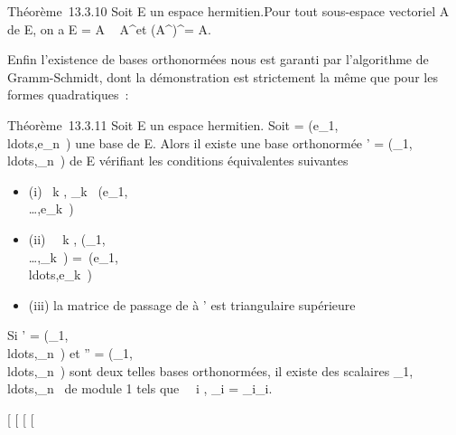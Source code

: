 \documentclass[]{article}
\begin{document}
Théorème~13.3.10 Soit E un espace hermitien.Pour tout sous-espace
vectoriel A de E, on a E = A \oplus~ A^\bot et
(A^\bot)^\bot = A.

Enfin l'existence de bases orthonormées nous est garanti par
l'algorithme de Gramm-Schmidt, dont la démonstration est strictement la
même que pour les formes quadratiques~:

Théorème~13.3.11 Soit E un espace hermitien. Soit  =
(e_1,\\ldots,e_n~)
une base de E. Alors il existe une base orthonormée ' =
(\epsilon_1,\\ldots,\epsilon_n~)
de E vérifiant les conditions équivalentes suivantes

\begin{itemize}
\itemsep1pt\parskip0pt
\item
  (i) \forall~k \in [1,n], \epsilon_k~
  \in\mathrmVect(e_1,\\\ldots,e_k~)
\item
  (ii) \forall~~k \in [1,n],
  \mathrmVect(\epsilon_1,\\\ldots,\epsilon_k~)
  =\
  \mathrmVect(e_1,\\ldots,e_k~)
\item
  (iii) la matrice de passage de  à ' est triangulaire supérieure
\end{itemize}

Si ' =
(\epsilon_1,\\ldots,\epsilon_n~)
et \mathcal{E}'' =
(\eta_1,\\ldots,\eta_n~)
sont deux telles bases orthonormées, il existe des scalaires
\lambda_1,\\ldots,\lambda_n~
de module 1 tels que \forall~~i \in [1,n],
\eta_i = \lambda_i\epsilon_i.

[
[
[
[
\end{document}
